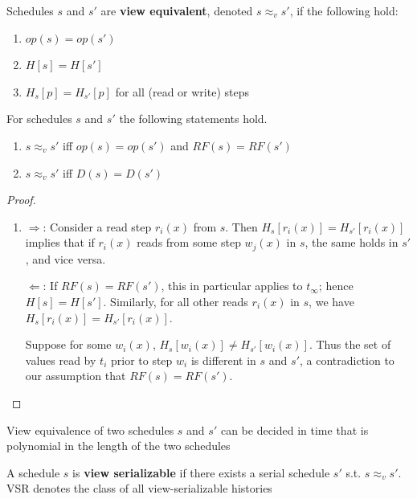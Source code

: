 \documentclass[11pt]{article}
\begin{document}
\begin{definition}
Schedules \(s\) and \(s'\) are \textbf{view equivalent}, denoted \(s\approx_vs'\), if the following
hold:
\begin{enumerate}
\item \(op(s)=op(s')\)
\item \(H[s]=H[s']\)
\item \(H_s[p]=H_{s'}[p]\) for all (read or write) steps
\end{enumerate}
\end{definition}

\begin{theorem}[]
For schedules \(s\) and \(s'\) the following statements hold.
\begin{enumerate}
\item \(s\approx_v s'\) iff \(op(s)=op(s')\) and \(RF(s)=RF(s')\)
\item \(s\approx_vs'\) iff \(D(s)=D(s')\)
\end{enumerate}
\end{theorem}

\begin{proof}
\begin{enumerate}
\item \(\Rightarrow\): Consider a read step \(r_i(x)\) from \(s\).
Then \(H_s[r_i(x)]=H_{s'}[r_i(x)]\) implies that if \(r_i(x)\) reads from some
step \(w_j(x)\) in \(s\), the same holds in \(s'\), and vice versa.

\(\Leftarrow\): If \(RF(s)=RF(s')\), this in particular applies to \(t_\infty\);
hence \(H[s]=H[s']\). Similarly, for all other reads \(r_i(x)\) in \(s\), we
have \(H_s[r_i(x)]=H_{s'}[r_i(x)]\).

Suppose for some \(w_i(x)\), \(H_s[w_i(x)]\neq H_{s'}[w_i(x)]\). Thus the set of values read
by \(t_i\) prior to step \(w_i\) is different in \(s\) and \(s'\), a contradiction to our
assumption that \(RF(s)=RF(s')\).
\end{enumerate}
\end{proof}

\begin{corollary}[]
View equivalence of two schedules \(s\) and \(s'\) can be decided in time that is polynomial in
the length of the two schedules
\end{corollary}

\begin{definition}[]
A schedule \(s\) is \textbf{view serializable} if there exists a serial schedule \(s'\)
s.t. \(s\approx_vs'\). VSR denotes the class of all view-serializable histories
\end{definition}
\end{document}
